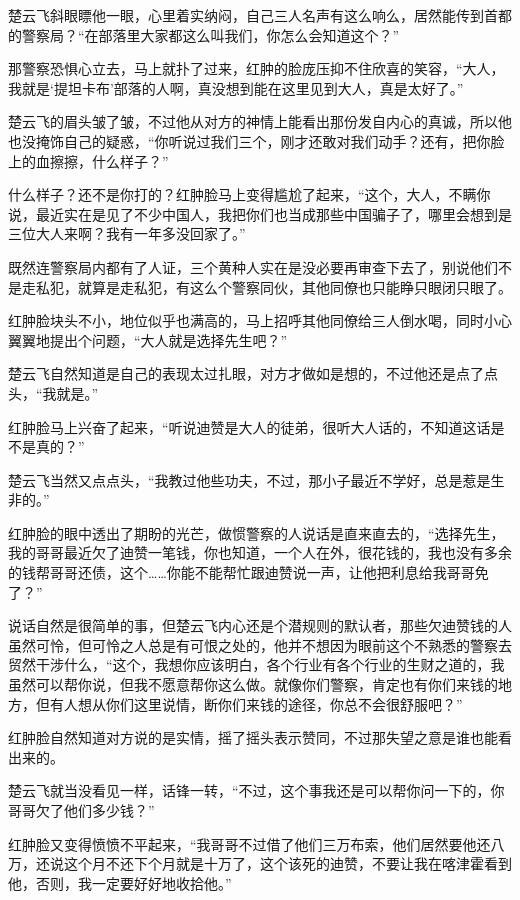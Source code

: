楚云飞斜眼瞟他一眼，心里着实纳闷，自己三人名声有这么响么，居然能传到首都的警察局？“在部落里大家都这么叫我们，你怎么会知道这个？”

那警察恐惧心立去，马上就扑了过来，红肿的脸庞压抑不住欣喜的笑容，“大人，我就是‘提坦卡布’部落的人啊，真没想到能在这里见到大人，真是太好了。”

楚云飞的眉头皱了皱，不过他从对方的神情上能看出那份发自内心的真诚，所以他也没掩饰自己的疑惑，“你听说过我们三个，刚才还敢对我们动手？还有，把你脸上的血擦擦，什么样子？”

什么样子？还不是你打的？红肿脸马上变得尴尬了起来，“这个，大人，不瞒你说，最近实在是见了不少中国人，我把你们也当成那些中国骗子了，哪里会想到是三位大人来啊？我有一年多没回家了。”

既然连警察局内都有了人证，三个黄种人实在是没必要再审查下去了，别说他们不是走私犯，就算是走私犯，有这么个警察同伙，其他同僚也只能睁只眼闭只眼了。

红肿脸块头不小，地位似乎也满高的，马上招呼其他同僚给三人倒水喝，同时小心翼翼地提出个问题，“大人就是选择先生吧？”

楚云飞自然知道是自己的表现太过扎眼，对方才做如是想的，不过他还是点了点头，“我就是。”

红肿脸马上兴奋了起来，“听说迪赞是大人的徒弟，很听大人话的，不知道这话是不是真的？”

楚云飞当然又点点头，“我教过他些功夫，不过，那小子最近不学好，总是惹是生非的。”

红肿脸的眼中透出了期盼的光芒，做惯警察的人说话是直来直去的，“选择先生，我的哥哥最近欠了迪赞一笔钱，你也知道，一个人在外，很花钱的，我也没有多余的钱帮哥哥还债，这个……你能不能帮忙跟迪赞说一声，让他把利息给我哥哥免了？”

说话自然是很简单的事，但楚云飞内心还是个潜规则的默认者，那些欠迪赞钱的人虽然可怜，但可怜之人总是有可恨之处的，他并不想因为眼前这个不熟悉的警察去贸然干涉什么，“这个，我想你应该明白，各个行业有各个行业的生财之道的，我虽然可以帮你说，但我不愿意帮你这么做。就像你们警察，肯定也有你们来钱的地方，但有人想从你们这里说情，断你们来钱的途径，你总不会很舒服吧？”

红肿脸自然知道对方说的是实情，摇了摇头表示赞同，不过那失望之意是谁也能看出来的。

楚云飞就当没看见一样，话锋一转，“不过，这个事我还是可以帮你问一下的，你哥哥欠了他们多少钱？”

红肿脸又变得愤愤不平起来，“我哥哥不过借了他们三万布索，他们居然要他还八万，还说这个月不还下个月就是十万了，这个该死的迪赞，不要让我在喀津霍看到他，否则，我一定要好好地收拾他。”

